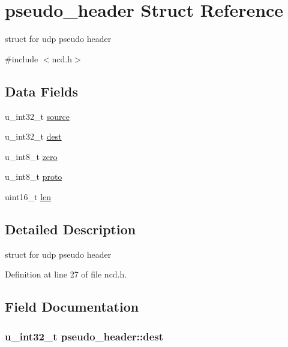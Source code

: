 \hypertarget{structpseudo__header}{\section{pseudo\-\_\-header Struct Reference}
\label{structpseudo__header}
}


struct for udp pseudo header  




{\ttfamily \#include $<$ncd.\-h$>$}

\subsection*{Data Fields}
\begin{DoxyCompactItemize}
\item 
u\-\_\-int32\-\_\-t \hyperlink{structpseudo__header_ac1d63e2b666037057fba16b852c83549}{source}
\item 
u\-\_\-int32\-\_\-t \hyperlink{structpseudo__header_a825382766bd224e1ab209d7e1248efa8}{dest}
\item 
u\-\_\-int8\-\_\-t \hyperlink{structpseudo__header_a2a93c892eaf942dfb5c28a69c88f0ad7}{zero}
\item 
u\-\_\-int8\-\_\-t \hyperlink{structpseudo__header_acdb79cab7f361df75fe519e43e1db18c}{proto}
\item 
uint16\-\_\-t \hyperlink{structpseudo__header_a436e199ba010989dff88ba26ee6de668}{len}
\end{DoxyCompactItemize}


\subsection{Detailed Description}
struct for udp pseudo header 

Definition at line 27 of file ncd.\-h.



\subsection{Field Documentation}
\hypertarget{structpseudo__header_a825382766bd224e1ab209d7e1248efa8}{
\subsubsection[{dest}]{\setlength{\rightskip}{0pt plus 5cm}u\-\_\-int32\-\_\-t pseudo\-\_\-header\-::dest}}\label{structpseudo__header_a825382766bd224e1ab209d7e1248efa8}


